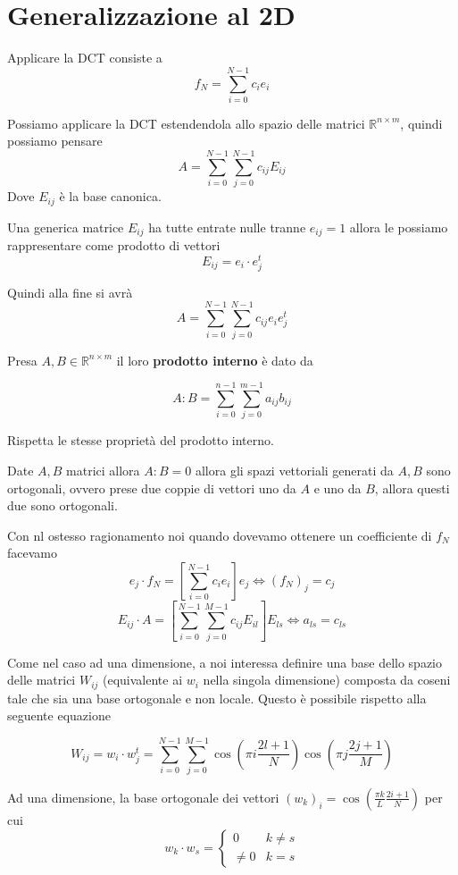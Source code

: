 \section{Generalizzazione al 2D}

Applicare la DCT consiste a 
$$f_N = \sum_{i=0}^{N-1} c_i e_i$$ 

Possiamo applicare la DCT estendendola allo spazio delle matrici $\mathbb{R}^{n\times m}$,
quindi possiamo pensare 
$$A=\sum_{i=0}^{N-1} \sum_{j=0}^{N-1}c_{ij}E_{ij}$$
Dove $E_{ij}$ è la base canonica.

Una generica matrice $E_{ij}$ ha tutte entrate nulle tranne $e_{ij}=1$ allora 
le possiamo rappresentare come prodotto di vettori
$$E_{ij} = e_i \cdot e_j^t$$

Quindi alla fine si avrà
$$A=\sum_{i=0}^{N-1} \sum_{j=0}^{N-1}c_{ij}e_i e_j^t$$

\begin{definizione}
    Presa $A,B\in \mathbb{R}^{n\times m}$ il loro \textbf{prodotto interno} è dato 
    da

    $$A:B = \sum_{i=0}^{n-1} \sum_{j= 0}^{m-1} a_{ij}b_{ij}$$
\end{definizione}

Rispetta le stesse proprietà del prodotto interno. 
\begin{nota}
    Date $A,B$ matrici allora $A:B=0$ allora gli spazi vettoriali generati da $A,B$
    sono ortogonali, ovvero prese due coppie di vettori uno da $A$ e uno da $B$, 
    allora questi due sono ortogonali.
\end{nota}

Con nl ostesso ragionamento noi quando dovevamo ottenere un coefficiente di $f_N$ 
facevamo 
$$e_j\cdot f_N = \left[\sum_{i=0}^{N-1}c_i e_i\right] e_j\iff (f_N)_j = c_j$$
$$E_{ij}\cdot A = \left[\sum_{i=0}^{N-1}\sum_{j=0}^{M-1}c_{ij} E_{il}\right]  E_{ls} \iff a_{ls} = c_{ls} $$

Come nel caso ad una dimensione, a noi interessa definire una base dello spazio delle 
matrici $W_{ij}$ (equivalente ai $w_i$ nella singola dimensione) composta da coseni 
tale che sia una base ortogonale e non locale. Questo è possibile rispetto alla 
seguente equazione

$$W_{ij} = w_i\cdot w_j^t = \sum_{i=0}^{N-1} \sum_{j=0}^{M-1} \cos\left(\pi i\frac{2l+1}{N}\right)\cos\left(\pi j\frac{2j+1}{M}\right)$$

Ad una dimensione, la base ortogonale dei vettori $(w_k)_i = \cos \left(\frac{\pi k}{L} \frac{2i+1}{N}\right)$
per cui 
$$w_k \cdot w_s = \begin{cases}
    0 & k\ne s\\
    \ne 0 & k = s
\end{cases}$$

